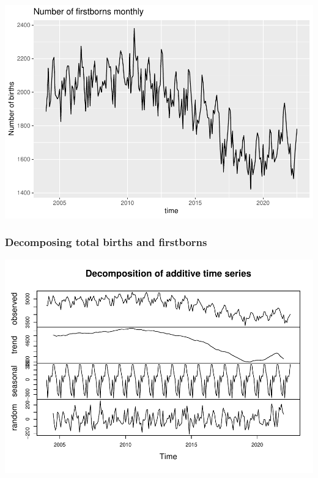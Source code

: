 \documentclass[
]{article}
\newenvironment{Shaded}{\begin{snugshade}}{\end{snugshade}}
\newcommand{\AttributeTok}[1]{\textcolor[rgb]{0.77,0.63,0.00}{#1}}
\newcommand{\DecValTok}[1]{\textcolor[rgb]{0.00,0.00,0.81}{#1}}
\newcommand{\FunctionTok}[1]{\textcolor[rgb]{0.00,0.00,0.00}{#1}}
\newcommand{\NormalTok}[1]{#1}
\newcommand{\OtherTok}[1]{\textcolor[rgb]{0.56,0.35,0.01}{#1}}
\newcommand{\SpecialCharTok}[1]{\textcolor[rgb]{0.00,0.00,0.00}{#1}}
\begin{document}
\includegraphics{GoogleTrendsMarkdown_files/figure-latex/unnamed-chunk-2-2.pdf}

\hypertarget{decomposing-total-births-and-firstborns}{%
\subsubsection{Decomposing total births and
firstborns}\label{decomposing-total-births-and-firstborns}}

\begin{Shaded}
\end{Shaded}

\includegraphics{GoogleTrendsMarkdown_files/figure-latex/unnamed-chunk-3-1.pdf}
\end{document}
